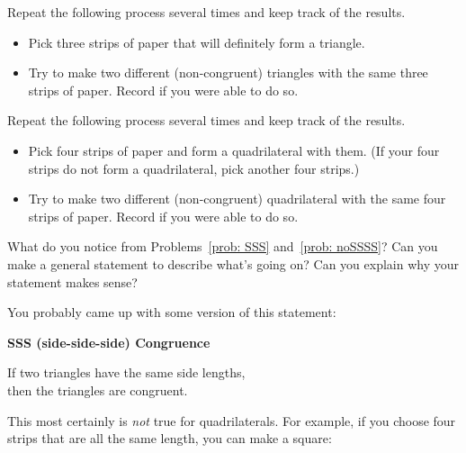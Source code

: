 \begin{problem}\label{prob: SSS}
Repeat the following process several times and keep track of the results.
\begin{itemize}
\item
Pick three  strips of paper that will definitely form a triangle. \\
\item
Try to make two different (non-congruent) triangles with the same three strips of paper.  Record if you were able to do so.
\end{itemize}
\end{problem}

\bigskip

\begin{problem}\label{prob: noSSSS}
Repeat the following process several times and keep track of the results.
\begin{itemize}
\item
Pick four  strips of paper and form a quadrilateral with them.  (If your four strips do not form a quadrilateral, pick another four strips.)\\ 
\item
Try to make two different (non-congruent) quadrilateral with the same four strips of paper.  Record if you were able to do so.
\end{itemize}
\end{problem}


\bigskip
\bigskip

\begin{thinkpair*}
What do you notice from Problems~\ref{prob: SSS} and~\ref{prob: noSSSS}?  Can you make a general statement to describe what's going on?  Can you explain why your statement makes sense?
\end{thinkpair*}

\newpage

You probably came up with some version of this statement:
\begin{center}
{\bf SSS (side-side-side) Congruence}

If two triangles have the same side lengths,\\
then the triangles are congruent.
\end{center}

\bigskip

This most certainly is \emph{not} true for quadrilaterals.  For example, if you choose four strips that are all the same length, you can make a square:

